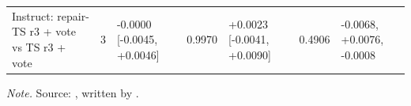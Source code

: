 \begin{landscape}
{\begin{longtable}{@{}p{6.2cm}clrlrp{4.0cm}@{}}
Instruct: repair-TS r3 + vote vs TS r3 + vote & 3 & -0.0000 [-0.0045, +0.0046] & 0.9970 & +0.0023 [-0.0041, +0.0090] & 0.4906 & -0.0068, +0.0076, -0.0008\\
\end{longtable}
}
\vspace{-0.6\baselineskip}
{\footnotesize\color{slate}\textit{Note.} Source: , written by .\par}
\medskip
\end{landscape}
